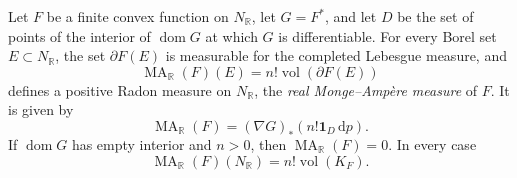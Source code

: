 \begin{theorem}\label{thm:alexandrov-measure-construction}
Let $F$ be a finite convex function on $N_{\mathbb R}$, let $G=F^*$, and let $D$ be the set of points of the interior of $\operatorname{dom}G$ at which $G$ is differentiable. For every Borel set $E\subset N_{\mathbb R}$, the set $\partial F(E)$ is measurable for the completed Lebesgue measure, and
\[
 \operatorname{MA}_{\mathbb R}(F)(E)=n!\operatorname{vol}(\partial F(E))
\]
defines a positive Radon measure on $N_{\mathbb R}$, the \emph{real Monge--Amp\`ere measure} of $F$. It is given by
\[
 \operatorname{MA}_{\mathbb R}(F)
                  =(\nabla G)_*(n!\mathbf1_D\,\mathrm dp).
\]
If $\operatorname{dom}G$ has empty interior and $n>0$, then $\operatorname{MA}_{\mathbb R}(F)=0$. In every case
\[
 \operatorname{MA}_{\mathbb R}(F)(N_{\mathbb R})
                        =n!\operatorname{vol}(K_F).
\]
\end{theorem}

